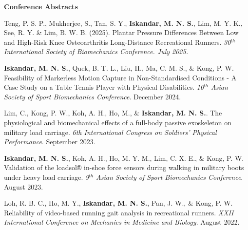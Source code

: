 \documentclass[../main.tex]{subfiles}
\begin{document}
        \textbf{Conference Abstracts}
        \def\labelprefix{CA}
        \begin{etaremune}
            \item\label{conference_abstract: isb2025} Teng, P. S. P., Mukherjee, S., Tan, S. Y., \textbf{Iskandar, M. N. S.}, Lim, M. Y. K., See, R. Y. \& Lim, B. W. B. (2025). Plantar Pressure Differences Between Low and High-Risk Knee Osteoarthritis Long-Distance Recreational Runners. \textit{30$^{th}$ International Society of Biomechanics Conference. July 2025.} 
            
            \item\label{conference_abstract: assbTableTennisMarkerless} {\textbf{Iskandar, M. N. S.}, Quek, B. T. L., Liu, H., Ma, C. M. S., \& Kong, P. W. Feasibility of Markerless Motion Capture in Non-Standardised Conditions - A Case Study on a Table Tennis Player with Physical Disabilities. \textit{10$^{th}$ Asian Society of Sport Biomechanics Conference}. December 2024.}
            
            \item\label{conference_abstract: cherylMilitary} {Lim, C., Kong, P. W., Koh, A. H., Ho, M., \& \textbf{Iskandar, M. N. S.}. The physiological and biomechanical effects of a full-body passive exoskeleton on military load carriage. \textit{6th International Congress on Soldiers' Physical Performance}. September 2023. {\href{https://cdn.asp.events/CLIENT_CLDD_9BDAB70C_5056_B733_4934A7872C9C46B0/sites/dsei-2023/media/ICSPP_program_book.pdf}{\faFilePdfO}}}

            \item\label{conference_abstract: assbLoadsolValidation} {\textbf{Iskandar, M. N. S.}, Koh, A. H., Ho, M. Y. M., Lim, C. X. E., \& Kong, P. W. Validation of the loadsol® in-shoe force sensors during walking in military boots under heavy load carriage. \textit{9$^{th}$ Asian Society of Sport Biomechanics Conference}. August 2023.}
            
            \item\label{conference_abstract: rayReliability} {Loh, R. B. C., Ho, M. Y., \textbf{Iskandar, M. N. S.}, Pan, J. W., \& Kong, P. W. Reliability of video-based running gait analysis in recreational runners. \textit{XXII International Conference on Mechanics in Medicine and Biology}. August 2022.}
        \end{etaremune}
        
            
        
  \resumeSubHeadingListEnd
\end{document}
